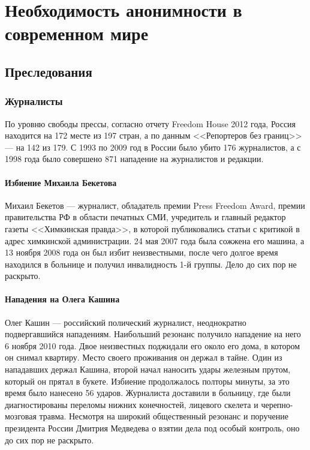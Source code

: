 \chapter{Необходимость анонимности в современном мире}
\section{Преследования}
\subsection{Журналисты}
По уровню свободы прессы, согласно отчету Freedom House 2012 года, Россия находится на 172 месте из 197 стран\cite{pressfreedom}, а по данным <<Репортеров без границ>> --- на 142 из 179\cite{rsf}. С 1993 по 2009 год в России было убито 176 журналистов\cite{kill}, а с 1998 года было совершено 871 нападение на журналистов и редакции\cite{attack}.
\subsubsection{Избиение Михаила Бекетова}
Михаил Бекетов --- журналист, обладатель премии Press Freedom Award\cite{beketov_award}, премии правительства РФ в области печатных СМИ\cite{beketov_gosaward}, учредитель и главный редактор газеты <<Химкинская правда>>, в которой публиковались статьи с критикой в адрес химкинской администрации. 24 мая 2007 года была сожжена его машина\cite{beketov_car}, а 13 ноября 2008 года он был избит неизвестными\cite{beketov_beat}, после чего долгое время находился в больнице и получил инвалидность 1-й группы\cite{beketov_invalid}. Дело до сих пор не раскрыто.
\subsubsection{Нападения на Олега Кашина}
Олег Кашин --- российский полический журналист, неоднократно подвергавшийся нападениям. Наибольший резонанс получило нападение на него 6 ноября 2010 года. Двое неизвестных поджидали его около его дома, в котором он снимал квартиру. Место своего проживания он держал в тайне. Один из нападавших держал Кашина, второй начал наносить удары железным прутом, который он прятал в букете\cite{kashin_beat}. Избиение продолжалось полторы минуты, за это время было нанесено 56 ударов\cite{kashin_count}. Журналиста доставили в больницу, где были диагностированы переломы нижних конечностей, лицевого скелета и черепно-мозговая травма\cite{kashin_trauma}. Несмотря на широкий общественный резонанс и поручение президента России Дмитрия Медведева о взятии дела под особый контроль\cite{kashin_medvedev}, оно до сих пор не раскрыто.
